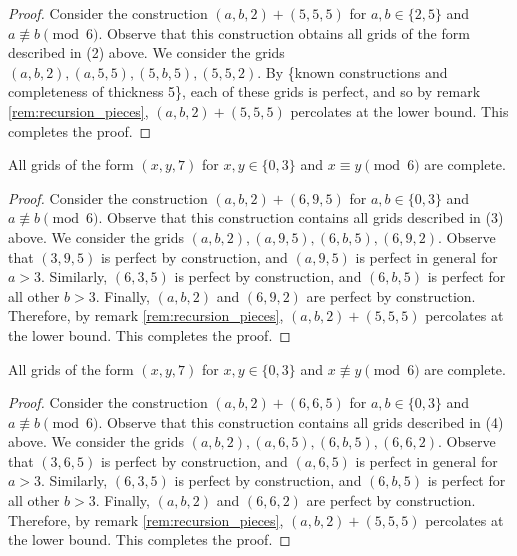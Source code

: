 \begin{proof}
Consider the construction $(a,b,2) + (5,5,5)$ for $a,b \in \{2,5\}$ and $a \not\equiv b \pmod 6$. Observe that this construction obtains all grids of the form described in (2) above. We consider the grids $(a,b,2), (a,5,5), (5,b,5), (5,5,2)$. By \{known constructions and completeness of thickness 5\}, each of these grids is perfect, and so by remark \ref{rem:recursion_pieces}, $(a,b,2) + (5,5,5)$ percolates at the lower bound. This completes the proof.
\end{proof}

\begin{lem}
\label{lem:thickness_7_case_3}
All grids of the form $(x,y,7)$ for $x,y \in \{0,3\}$ and $x \equiv y \pmod 6$ are complete.
\end{lem}

\begin{proof}
Consider the construction $(a,b,2) + (6,9,5)$ for $a,b \in \{0,3\}$ and $a \not\equiv b \pmod 6$. Observe that this construction contains all grids described in (3) above. We consider the grids $(a,b,2), (a,9,5), (6,b,5), (6,9,2)$. Observe that $(3,9,5)$ is perfect by construction, and $(a,9,5)$ is perfect in general for $a>3$. Similarly, $(6,3,5)$ is perfect by construction, and $(6,b,5)$ is perfect for all other $b>3$. Finally, $(a,b,2)$ and $(6,9,2)$ are perfect by construction. Therefore, by remark \ref{rem:recursion_pieces}, $(a,b,2) + (5,5,5)$ percolates at the lower bound. This completes the proof.
\end{proof}

\begin{lem}
\label{lem:thickness_7_case_4}
All grids of the form $(x,y,7)$ for $x,y \in \{0,3\}$ and $x \not\equiv y \pmod 6$ are complete.
\end{lem}

\begin{proof}
Consider the construction $(a,b,2) + (6,6,5)$ for $a,b \in \{0,3\}$ and $a \not\equiv b \pmod 6$. Observe that this construction contains all grids described in (4) above. We consider the grids $(a,b,2), (a,6,5), (6,b,5), (6,6,2)$. Observe that $(3,6,5)$ is perfect by construction, and $(a,6,5)$ is perfect in general for $a>3$. Similarly, $(6,3,5)$ is perfect by construction, and $(6,b,5)$ is perfect for all other $b>3$. Finally, $(a,b,2)$ and $(6,6,2)$ are perfect by construction. Therefore, by remark \ref{rem:recursion_pieces}, $(a,b,2) + (5,5,5)$ percolates at the lower bound. This completes the proof.
\end{proof}


